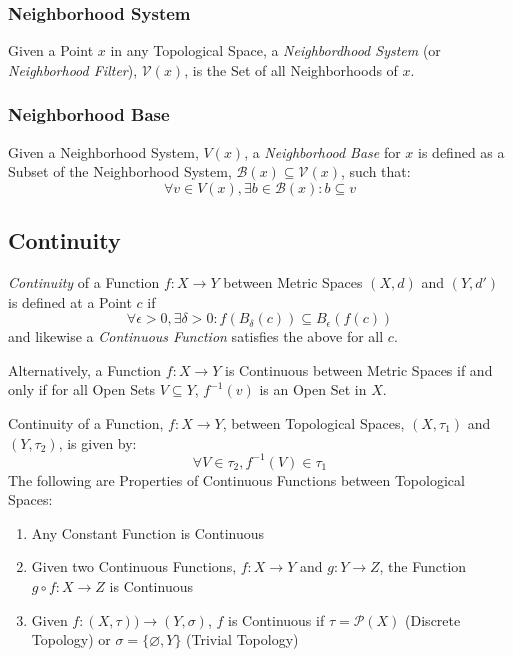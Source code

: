 \subsubsection{Neighborhood System}\label{sec:neighborhood_system}

Given a Point $x$ in any Topological Space, a \emph{Neighbordhood
  System} (or \emph{Neighborhood Filter}), $\mathcal{V}(x)$, is the
Set of all Neighborhoods of $x$.



\subsubsection{Neighborhood Base}\label{sec:neighborhood_base}

Given a Neighborhood System, $V(x)$, a \emph{Neighborhood Base} for
$x$ is defined as a Subset of the Neighborhood System, $\mathcal{B}(x)
\subseteq \mathcal{V}(x)$, such that:
\[
    \forall v \in V(x), \exists b \in \mathcal{B}(x) : b \subseteq v
\]



\subsection{Continuity}\label{sec:topological_continuity}

\emph{Continuity} of a Function $f : X \rightarrow Y$ between Metric
Spaces $(X,d)$ and $(Y,d')$ is defined at a Point $c$
if
\[
    \forall \epsilon > 0, \exists \delta > 0 :
    f (B_{\delta}(c)) \subseteq B_{\epsilon}(f(c))
\]
and likewise a \emph{Continuous Function} satisfies the above for all
$c$.

Alternatively, a Function $f: X \rightarrow Y$ is Continuous between
Metric Spaces if and only if for all Open Sets $V \subseteq Y$,
$f^{-1}(v)$ is an Open Set in $X$.

Continuity of a Function, $f : X \rightarrow Y$, between Topological
Spaces, $(X,\tau_1)$ and $(Y,\tau_2)$, is given by:
\[
    \forall V \in \tau_2, f^{-1}(V) \in \tau_1
\]
The following are Properties of Continuous Functions between
Topological Spaces:
\begin{enumerate}
    \item Any Constant Function is Continuous
    \item Given two Continuous Functions, $f : X \rightarrow Y$ and $g
      : Y \rightarrow Z$, the Function $g \circ f : X \rightarrow Z$ is
      Continuous
    \item Given $f : (X, \tau)) \rightarrow (Y, \sigma)$, $f$ is
      Continuous if $\tau = \mathcal{P}(X)$ (Discrete Topology) or
      $\sigma = \{\varnothing, Y\}$ (Trivial Topology)
\end{enumerate}



